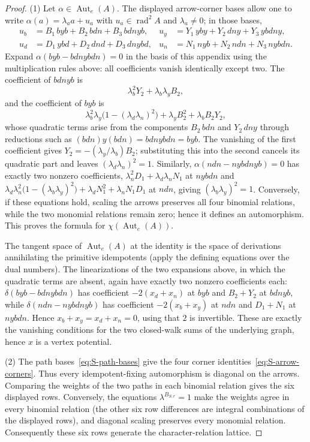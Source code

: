 \documentclass[11pt]{amsart}
\theoremstyle{plain}
\theoremstyle{definition}
\DeclareMathOperator{\rad}{rad}
\DeclareMathOperator{\Aut}{Aut}
\begin{document}
\begin{proof}
(1) Let $\alpha\in\Aut_e(A)$. The displayed arrow-corner bases allow one to write $\alpha(a)=\lambda_a a+u_a$
with $u_a\in\rad^2A$ and $\lambda_a\ne0$; in those bases,
\[
\begin{aligned}
 u_b&=B_1\,byb+B_2\,bdn+B_3\,bdnyb, & u_y&=Y_1\,yby+Y_2\,dny+Y_3\,ybdny,\\
 u_d&=D_1\,ybd+D_2\,dnd+D_3\,dnybd, & u_n&=N_1\,nyb+N_2\,ndn+N_3\,nybdn.
\end{aligned}
\]
Expand $\alpha(byb-bdnybdn)=0$ in the basis of this appendix using the multiplication rules above: all
coefficients vanish identically except two. The coefficient of $bdnyb$ is
\[
 \lambda_b^2Y_2+\lambda_b\lambda_yB_2,
\]
and the coefficient of $byb$ is
\[
 \lambda_b^2\lambda_y\bigl(1-(\lambda_d\lambda_n)^2\bigr)+\lambda_yB_2^2+\lambda_bB_2Y_2,
\]
whose quadratic terms arise from the components $B_2\,bdn$ and $Y_2\,dny$ through reductions such as
$(bdn)y(bdn)=bdnybdn=byb$. The vanishing of the first coefficient gives $Y_2=-(\lambda_y/\lambda_b)B_2$;
substituting this into the second cancels its quadratic part and leaves $(\lambda_d\lambda_n)^2=1$. Similarly,
$\alpha(ndn-nybdnyb)=0$ has exactly two nonzero coefficients, $\lambda_n^2D_1+\lambda_d\lambda_nN_1$ at
$nybdn$ and $\lambda_d\lambda_n^2\bigl(1-(\lambda_b\lambda_y)^2\bigr)+\lambda_dN_1^2+\lambda_nN_1D_1$ at
$ndn$, giving $(\lambda_b\lambda_y)^2=1$. Conversely, if these equations hold, scaling the arrows preserves
all four binomial relations, while the two monomial relations remain zero; hence it defines an automorphism.
This proves the formula for $\chi(\Aut_e(A))$.

The tangent space of $\Aut_e(A)$ at the identity is the space of derivations annihilating the primitive
idempotents (apply the defining equations over the dual numbers). The linearizations of the two expansions
above, in which the quadratic terms are absent, again have exactly two nonzero coefficients each:
$\delta(byb-bdnybdn)$ has coefficient $-2(x_d+x_n)$ at $byb$ and $B_2+Y_2$ at $bdnyb$, while
$\delta(ndn-nybdnyb)$ has coefficient $-2(x_b+x_y)$ at $ndn$ and $D_1+N_1$ at $nybdn$. Hence
$x_b+x_y=x_d+x_n=0$, using that $2$ is invertible. These are exactly the vanishing conditions for the two
closed-walk sums of the underlying graph, hence $x$ is a vertex potential.

(2) The path bases~\eqref{eq:S-path-bases} give the four corner identities~\eqref{eq:S-arrow-corners}. Thus
every idempotent-fixing automorphism is diagonal on the arrows. Comparing the weights of the two paths in each
binomial relation gives the six displayed rows. Conversely, the equations $\lambda^{B_{S,r}}=1$ make the
weights agree in every binomial relation (the other six row differences are integral combinations of the
displayed rows), and diagonal scaling preserves every monomial relation. Consequently these six rows generate
the character-relation lattice.


\end{proof}
\end{document}
